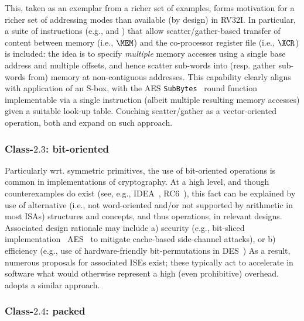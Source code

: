 This, taken as an exemplar from a richer set of examples, forms motivation
for a richer set of addressing modes than available (by design) in RV32I.
In particular, 
a suite of instructions 
(e.g.,  and )
that allow 
scatter/gather-based
transfer of content between
   memory                         (i.e., $\MEM$)
and
the    co-processor register file (i.e., $\XCR$)
is included: the idea is to specify {\em multiple} memory accesses using a
single base address and multiple offsets, and hence scatter sub-words into 
(resp. gather sub-words from) memory at non-contiguous addresses.  
This capability clearly aligns with application of an S-box, with the AES 
{\tt SubBytes}~\cite[Section 5.1.1]{SCARV:FIPS:197} 
round function implementable via a single  instruction 
(albeit multiple resulting memory accesses) given a suitable look-up table.
Couching scatter/gather as a vector-oriented operation, both
\cite[Section 3.1]{SCARV:FouMoo:05} 
and 
\cite[Section 3.3]{SCARV:Fournier:07}
expand on such approach.


\subsubsection{Class-$2.3$: bit-oriented}
\label{sec:bg:feature:2:3}

Particularly wrt. symmetric primitives, the use of bit-oriented operations 
is common in implementations of cryptography.  At a high level, and though 
counterexamples do exist 
(see, e.g., IDEA~\cite{SCARV:LaiMas:90}, RC6~\cite{SCARV:RRSY:98}),
this fact can be explained by use of alternative (i.e., not word-oriented
and/or not supported by arithmetic in most ISAs) structures and concepts,
and thus operations, in relevant designs.  Associated design rationale may
include
a) security
   (e.g., bit-sliced implementation~\cite{SCARV:KasSch:09} AES~\cite{SCARV:FIPS:197} to mitigate cache-based side-channel attacks),
   or
b) efficiency
   (e.g., use of hardware-friendly bit-permutations in DES~\cite{SCARV:FIPS:46_3})
As a result, numerous proposals for associated ISEs exist; these typically
act to accelerate in software what would otherwise represent a high (even 
prohibitive) overhead.  \XCID adopts a similar approach.


\subsubsection{Class-$2.4$: packed}
\label{sec:bg:feature:2:4}

